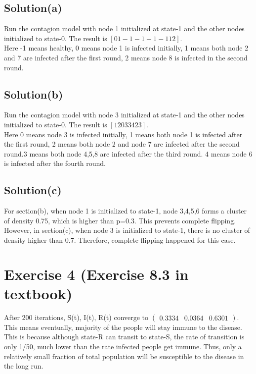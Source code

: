 \documentclass[12pt]{article}%
\begin{document}
\subsection{Solution(a)}
Run the contagion model with node 1 initialized at state-1 and the other nodes initialized to state-0. The result is $[0  1 -1 -1 -1 -1  1  2]$. 
\medskip\\Here -1 means healthy, 0 means node 1 is infected initially, 1 means both node 2 and 7 are infected after the first round, 2 means node 8 is infected in the second round.
\subsection{Solution(b)}
Run the contagion model with node 3 initialized at state-1 and the other nodes initialized to state-0. The result is $[1 2 0 3 3 4 2 3]$.
\medskip\\ Here 0 means node 3 is infected initially, 1 means both node 1 is infected after the first round, 2 means both node 2 and node 7 are infected after the second round.3 means both node 4,5,8 are infected after the third round. 4 means node 6 is infected after the fourth round.
\subsection{Solution(c)} 
For section(b), when node 1 is initialized to state-1, node 3,4,5,6 forms a cluster of density 0.75, which is higher than p=0.3. This prevents complete flipping. However, in section(c), when node 3 is initialized to state-1, there is no cluster of density higher than 0.7. Therefore, complete flipping happened for this case.
\section{Exercise 4 (Exercise 8.3 in textbook)}     
After 200 iterations, S(t), I(t), R(t) converge to $\left(\begin{matrix}0.3334&0.0364&0.6301\end{matrix}\right)$. This means eventually, majority of the people will stay immune to the disease. This is because although state-R can transit to state-S, the rate of transition is only 1/50, much lower than the rate infected people get immune. Thus, only a relatively small fraction of total population will be susceptible to the disease in the long run.
\end{document}
